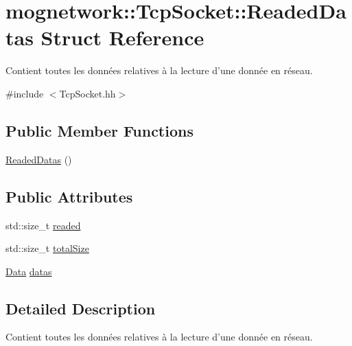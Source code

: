 \hypertarget{structmognetwork_1_1_tcp_socket_1_1_readed_datas}{\section{mognetwork\-:\-:Tcp\-Socket\-:\-:Readed\-Datas Struct Reference}
\label{structmognetwork_1_1_tcp_socket_1_1_readed_datas}
}


Contient toutes les données relatives à la lecture d'une donnée en réseau.  




{\ttfamily \#include $<$Tcp\-Socket.\-hh$>$}

\subsection*{Public Member Functions}
\begin{DoxyCompactItemize}
\item 
\hyperlink{structmognetwork_1_1_tcp_socket_1_1_readed_datas_a5f000677cc0bfc88c3ab563ede5907ab}{Readed\-Datas} ()
\end{DoxyCompactItemize}
\subsection*{Public Attributes}
\begin{DoxyCompactItemize}
\item 
std\-::size\-\_\-t \hyperlink{structmognetwork_1_1_tcp_socket_1_1_readed_datas_a2c633a79efa956f1f59d9429e8584cc0}{readed}
\item 
std\-::size\-\_\-t \hyperlink{structmognetwork_1_1_tcp_socket_1_1_readed_datas_aac0aa498d4b98296434cf05785068dcc}{total\-Size}
\item 
\hyperlink{classmognetwork_1_1_tcp_socket_aa80d910649a16cedb6c98297e5893ed1}{Data} \hyperlink{structmognetwork_1_1_tcp_socket_1_1_readed_datas_abfdc3750f4970fde4212d7a0e934daa9}{datas}
\end{DoxyCompactItemize}


\subsection{Detailed Description}
Contient toutes les données relatives à la lecture d'une donnée en réseau. 

